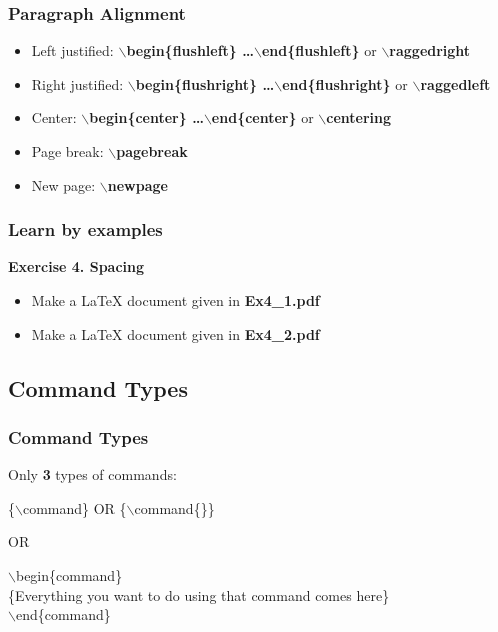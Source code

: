 \documentclass [9pt] {beamer}
\begin{document}
\begin{frame}\frametitle{Paragraph Alignment}
\rm
\fontsize{9pt}{11pt}\selectfont
\begin{itemize}
     \item Left justified: {\bf $\backslash$begin\{flushleft\} \dots $\backslash$end\{flushleft\}} or {\bf $\backslash$raggedright} \\[.20cm]
 \item Right justified: {\bf $\backslash$begin\{flushright\} \dots $\backslash$end\{flushright\}} or {\bf $\backslash$raggedleft} \\[.20cm]
\item Center: {\bf $\backslash$begin\{center\} \dots $\backslash$end\{center\}} or {\bf $\backslash$centering}\\[.20cm]

\item Page break: \textbf{$\backslash$pagebreak}\\[.20cm]
\item New page: \textbf{$\backslash$newpage}
\end{itemize}
\end{frame}

\begin{frame}\frametitle{Learn by examples}
\rm
\fontsize{9pt}{11pt}\selectfont

\textbf{Exercise 4. Spacing}\\[.30cm]
\begin{itemize}
	\item Make a LaTeX document given in \textbf{Ex4\_1.pdf}
	\item Make a LaTeX document given in \textbf{Ex4\_2.pdf}
	
\end{itemize}

\end{frame}

\subsection{Command Types}\label{Command Types}
\begin{frame}\frametitle{Command Types}
\fontsize{10pt}{12pt}\selectfont
Only \textbf{3} types of commands:

\{$\backslash$command\}   OR  \{$\backslash$command\{\}\}

OR

$\backslash$begin\{command\}\\
\{Everything you want to do using that command comes here\}\\
$\backslash$end\{command\}
\end{frame}
\end{document}
